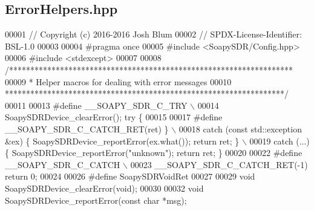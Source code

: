 \subsection{Error\+Helpers.\+hpp}
\label{ErrorHelpers_8hpp_source}

\begin{DoxyCode}
00001 \textcolor{comment}{// Copyright (c) 2016-2016 Josh Blum}
00002 \textcolor{comment}{// SPDX-License-Identifier: BSL-1.0}
00003 
00004 \textcolor{preprocessor}{#pragma once}
00005 \textcolor{preprocessor}{#include <SoapySDR/Config.hpp>}
00006 \textcolor{preprocessor}{#include <stdexcept>}
00007 
00008 \textcolor{comment}{/*******************************************************************}
00009 \textcolor{comment}{ * Helper macros for dealing with error messages}
00010 \textcolor{comment}{ ******************************************************************/}
00011 
00013 \textcolor{preprocessor}{#define \_\_SOAPY\_SDR\_C\_TRY \(\backslash\)}
00014 \textcolor{preprocessor}{    SoapySDRDevice\_clearError(); try \{}
00015 
00017 \textcolor{preprocessor}{#define \_\_SOAPY\_SDR\_C\_CATCH\_RET(ret) \} \(\backslash\)}
00018 \textcolor{preprocessor}{    catch (const std::exception &ex) \{ SoapySDRDevice\_reportError(ex.what()); return ret; \} \(\backslash\)}
00019 \textcolor{preprocessor}{    catch (...) \{ SoapySDRDevice\_reportError("unknown"); return ret; \}}
00020 
00022 \textcolor{preprocessor}{#define \_\_SOAPY\_SDR\_C\_CATCH \(\backslash\)}
00023 \textcolor{preprocessor}{    \_\_SOAPY\_SDR\_C\_CATCH\_RET(-1) return 0;}
00024 
00026 \textcolor{preprocessor}{#define SoapySDRVoidRet}
00027 
00029 \textcolor{keywordtype}{void} SoapySDRDevice_clearError(\textcolor{keywordtype}{void});
00030 
00032 \textcolor{keywordtype}{void} SoapySDRDevice_reportError(\textcolor{keyword}{const} \textcolor{keywordtype}{char} *msg);
\end{DoxyCode}
